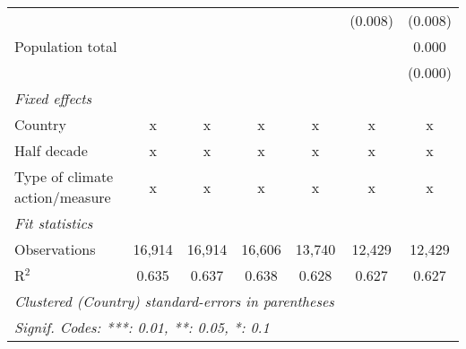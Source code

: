 \begin{tabular}{lcccccc}
                                        &         &         &             &                & (0.008)        & (0.008)\\   
   Population total                     &         &         &             &                &                & 0.000\\   
                                        &         &         &             &                &                & (0.000)\\   
   \emph{Fixed effects}\\
   Country                              & x       & x       & x           & x              & x              & x\\  
   Half decade                          & x       & x       & x           & x              & x              & x\\  
   Type of climate action/measure       & x       & x       & x           & x              & x              & x\\  
   \midrule \emph{Fit statistics}\\
   Observations                         & 16,914  & 16,914  & 16,606      & 13,740         & 12,429         & 12,429\\  
   R$^2$                                & 0.635   & 0.637   & 0.638       & 0.628          & 0.627          & 0.627\\  
   \midrule
   \multicolumn{7}{l}{\emph{Clustered (Country) standard-errors in parentheses}}\\
   \multicolumn{7}{l}{\emph{Signif. Codes: ***: 0.01, **: 0.05, *: 0.1}}\\
\end{tabular}
\par\endgroup


